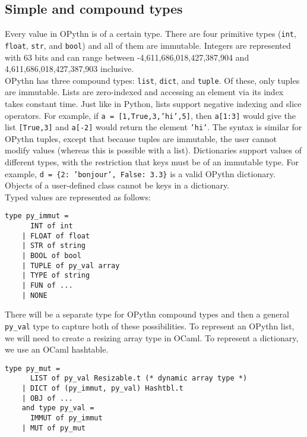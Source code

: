 \documentclass[11pt, twoside]{article}
\newcommand{\ms}{\texttt}
\begin{document}
    \subsection{Simple and compound types}
    Every value in OPythn is of a certain type. There are four primitive types (\ms{int}, \ms{float}, \ms{str}, and \ms{bool}) and all of them are immutable. Integers are represented with 63 bits and can range between -4,611,686,018,427,387,904 and 4,611,686,018,427,387,903 inclusive.\\
    \indent OPythn has three compound types: \ms{list}, \ms{dict}, and \ms{tuple}. Of these, only tuples are immutable. Lists are zero-indexed and accessing an element via its index takes constant time. Just like in Python, lists support negative indexing and slice operators. For example, if \ms{a = [1,True,3,'hi',5]}, then \ms{a[1:3]} would give the list \ms{[True,3]} and \ms{a[-2]} would return the element \ms{'hi'}. The syntax is similar for OPythn tuples, except that because tuples are immutable, the user cannot modify values (whereas this is possible with a list). Dictionaries support values of different types, with the restriction that keys must be of an immutable type. For example, \ms{d = \{2: 'bonjour', False: 3.3\}} is a valid OPythn dictionary. Objects of a user-defined class cannot be keys in a dictionary.\\
    \indent Typed values are represented as follows:
    \begin{lstlisting}[language=caml]
    type py_immut =
      INT of int
    | FLOAT of float
    | STR of string
    | BOOL of bool
    | TUPLE of py_val array
    | TYPE of string
    | FUN of ...
    | NONE
    \end{lstlisting}
    There will be a separate type for OPythn compound types and then a general \ms{py\_val} type to capture both of these possibilities. To represent an OPythn list, we will need to create a resizing array type in OCaml. To represent a dictionary, we use an OCaml hashtable.
    \begin{lstlisting}[language=caml]
    type py_mut =
      LIST of py_val Resizable.t (* dynamic array type *)
    | DICT of (py_immut, py_val) Hashtbl.t
    | OBJ of ...
    and type py_val =
      IMMUT of py_immut
    | MUT of py_mut
    \end{lstlisting}
\end{document}
